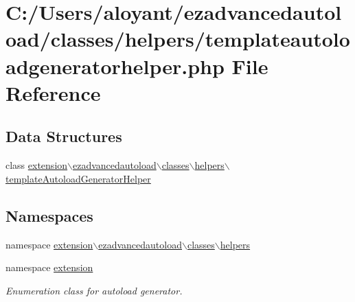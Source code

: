 \hypertarget{templateautoloadgeneratorhelper_8php}{\section{C\-:/\-Users/aloyant/ezadvancedautoload/classes/helpers/templateautoloadgeneratorhelper.php File Reference}
\label{templateautoloadgeneratorhelper_8php}
}
\subsection*{Data Structures}
\begin{DoxyCompactItemize}
\item 
class \hyperlink{classextension_1_1ezadvancedautoload_1_1classes_1_1helpers_1_1template_autoload_generator_helper}{extension$\backslash$ezadvancedautoload$\backslash$classes$\backslash$helpers$\backslash$template\-Autoload\-Generator\-Helper}
\end{DoxyCompactItemize}
\subsection*{Namespaces}
\begin{DoxyCompactItemize}
\item 
namespace \hyperlink{namespaceextension_1_1ezadvancedautoload_1_1classes_1_1helpers}{extension$\backslash$ezadvancedautoload$\backslash$classes$\backslash$helpers}
\item 
namespace \hyperlink{namespaceextension}{extension}
\begin{DoxyCompactList}\small\item\em Enumeration class for autoload generator. \end{DoxyCompactList}\end{DoxyCompactItemize}
